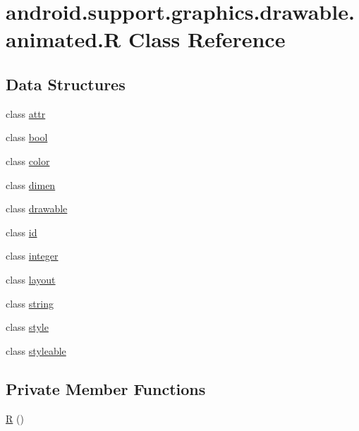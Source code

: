 \hypertarget{classandroid_1_1support_1_1graphics_1_1drawable_1_1animated_1_1_r}{}\section{android.\+support.\+graphics.\+drawable.\+animated.\+R Class Reference}
\label{classandroid_1_1support_1_1graphics_1_1drawable_1_1animated_1_1_r}
\subsection*{Data Structures}
\begin{DoxyCompactItemize}
\item 
class \mbox{\hyperlink{classandroid_1_1support_1_1graphics_1_1drawable_1_1animated_1_1_r_1_1attr}{attr}}
\item 
class \mbox{\hyperlink{classandroid_1_1support_1_1graphics_1_1drawable_1_1animated_1_1_r_1_1bool}{bool}}
\item 
class \mbox{\hyperlink{classandroid_1_1support_1_1graphics_1_1drawable_1_1animated_1_1_r_1_1color}{color}}
\item 
class \mbox{\hyperlink{classandroid_1_1support_1_1graphics_1_1drawable_1_1animated_1_1_r_1_1dimen}{dimen}}
\item 
class \mbox{\hyperlink{classandroid_1_1support_1_1graphics_1_1drawable_1_1animated_1_1_r_1_1drawable}{drawable}}
\item 
class \mbox{\hyperlink{classandroid_1_1support_1_1graphics_1_1drawable_1_1animated_1_1_r_1_1id}{id}}
\item 
class \mbox{\hyperlink{classandroid_1_1support_1_1graphics_1_1drawable_1_1animated_1_1_r_1_1integer}{integer}}
\item 
class \mbox{\hyperlink{classandroid_1_1support_1_1graphics_1_1drawable_1_1animated_1_1_r_1_1layout}{layout}}
\item 
class \mbox{\hyperlink{classandroid_1_1support_1_1graphics_1_1drawable_1_1animated_1_1_r_1_1string}{string}}
\item 
class \mbox{\hyperlink{classandroid_1_1support_1_1graphics_1_1drawable_1_1animated_1_1_r_1_1style}{style}}
\item 
class \mbox{\hyperlink{classandroid_1_1support_1_1graphics_1_1drawable_1_1animated_1_1_r_1_1styleable}{styleable}}
\end{DoxyCompactItemize}
\subsection*{Private Member Functions}
\begin{DoxyCompactItemize}
\item 
\mbox{\hyperlink{classandroid_1_1support_1_1graphics_1_1drawable_1_1animated_1_1_r_a097d34d9cd60fadc6a4ed075ffdd2f7b}{R}} ()
\end{DoxyCompactItemize}


